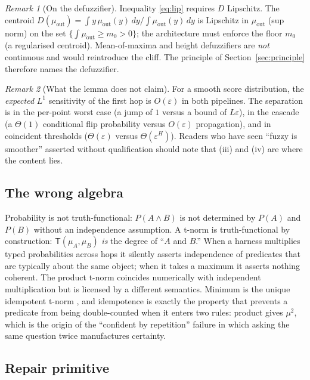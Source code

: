 \documentclass[11pt,a4paper]{article}
\numberwithin{equation}{section}
\theoremstyle{plain}
\theoremstyle{definition}
\theoremstyle{remark}
\newtheorem{remark}{Remark}
\begin{document}
\begin{remark}[On the defuzzifier]
Inequality \eqref{eq:lip} requires $D$ Lipschitz. The centroid $D(\mu_{\mathrm{out}}) = \int y\,\mu_{\mathrm{out}}(y)\,dy\big/\int\mu_{\mathrm{out}}(y)\,dy$ is Lipschitz in $\mu_{\mathrm{out}}$ (sup norm) on the set $\{\int\mu_{\mathrm{out}}\ge m_0>0\}$; the architecture must enforce the floor $m_0$ (a regularised centroid). Mean-of-maxima and height defuzzifiers are \emph{not} continuous and would reintroduce the cliff. The principle of Section~\ref{sec:principle} therefore names the defuzzifier.
\end{remark}

\begin{remark}[What the lemma does not claim]
For a smooth score distribution, the \emph{expected} $L^1$ sensitivity of the first hop is $O(\varepsilon)$ in both pipelines. The separation is in the per-point worst case (a jump of $1$ versus a bound of $L\varepsilon$), in the cascade (a $\Theta(1)$ conditional flip probability versus $O(\varepsilon)$ propagation), and in coincident thresholds ($\Theta(\varepsilon)$ versus $\Theta(\varepsilon^H)$). Readers who have seen ``fuzzy is smoother'' asserted without qualification should note that (iii) and (iv) are where the content lies.
\end{remark}

\subsection{The wrong algebra}

Probability is not truth-functional: $P(A\wedge B)$ is not determined by $P(A)$ and $P(B)$ without an independence assumption. A t-norm is truth-functional by construction: $\mathsf T(\mu_A,\mu_B)$ \emph{is} the degree of ``$A$ and $B$.'' When a harness multiplies typed probabilities across hops it silently asserts independence of predicates that are typically about the same object; when it takes a maximum it asserts nothing coherent. The product t-norm coincides numerically with independent multiplication but is licensed by a different semantics. Minimum is the unique idempotent t-norm \citep{klement2000}, and idempotence is exactly the property that prevents a predicate from being double-counted when it enters two rules: product gives $\mu^2$, which is the origin of the ``confident by repetition'' failure in which asking the same question twice manufactures certainty.

\subsection{Repair primitive}\label{sec:repair2}
\end{document}
